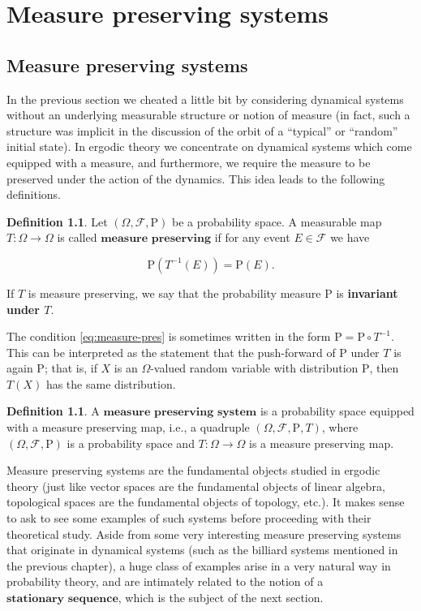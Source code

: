 \documentclass[11pt]{report}
\theoremstyle{plain}
\theoremstyle{definition}
\newtheorem{defn}[thm]{Definition}
\begin{document}
\chapter{Measure preserving systems}

\section{Measure preserving systems}

In the previous section we cheated a little bit by
considering dynamical systems without an underlying
measurable structure or notion of measure (in fact,
such a structure was implicit in the discussion of the
orbit of a ``typical'' or ``random'' initial state).
In ergodic theory we concentrate on dynamical systems
which come equipped with a measure, and furthermore,
we require the measure to be preserved under the
action of the dynamics. This idea leads to the
following definitions.

\begin{defn}
Let $(\Omega, \mathcal{F}, \mathrm{P})$ be a
probability space. A measurable map
$T:\Omega\to\Omega$ is called
$\textbf{measure preserving}$ if for any event
$E\in\mathcal{F}$ we have

\begin{equation*} \tag{13}\label{eq:measure-pres}
\mathrm{P}(T^{-1}(E)) = \mathrm{P}(E).
\end{equation*}

\noindent If $T$ is measure preserving, we say that the
probability measure $\mathrm{P}$ is \textbf{invariant under
$T$}.
\end{defn}

\noindent The condition \eqref{eq:measure-pres} is sometimes
written in the form
$\mathrm{P}=\mathrm{P}\circ T^{-1}$. This can be
interpreted as the statement that the push-forward of
$\mathrm{P}$ under $T$ is again $\mathrm{P}$; that
is, if $X$ is an $\Omega$-valued random variable with
distribution $\mathrm{P}$, then $T(X)$ has the same
distribution.

\begin{defn}
A $\textbf{measure preserving system}$ is a
probability space equipped with a measure preserving
map, i.e., a quadruple
$(\Omega, \mathcal{F}, \mathrm{P}, T)$, where
$(\Omega,\mathcal{F},\mathrm{P})$ is a probability
space and $T:\Omega\to\Omega$ is a measure preserving
map.
\end{defn}

\noindent Measure preserving systems are the fundamental
objects studied in ergodic theory (just like vector
spaces are the fundamental objects of linear algebra,
topological spaces are the fundamental objects of
topology, etc.). It makes sense to ask to see some
examples of such systems before proceeding with their
theoretical study. Aside from some very interesting
measure preserving systems that originate in dynamical
systems (such as the billiard systems mentioned in the
previous chapter), a huge class of examples arise in a
very natural way in probability theory, and are
intimately related to the notion of a
$\textbf{stationary sequence}$, which is the subject
of the next section.
\end{document}
